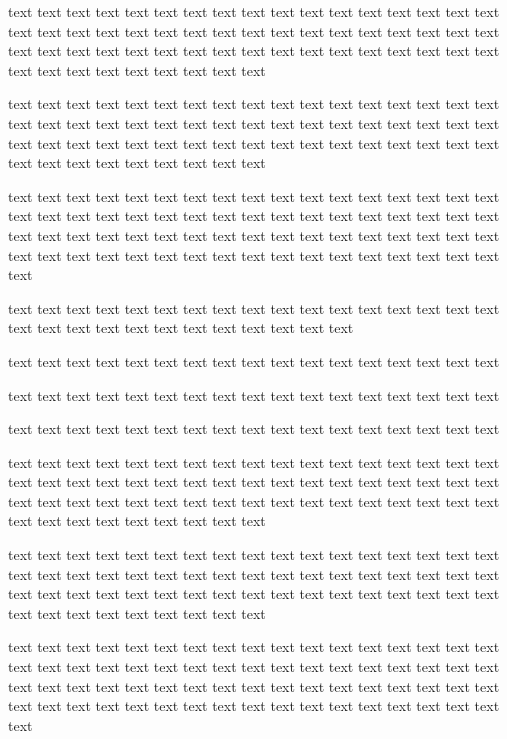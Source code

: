 \documentclass[twocolumn]{article}
\begin{document}
text text text text text text text text text text text text text text text text text text text text text text text text text text text text text text text text text text text text text text text text text text text text text text text text text text text text text text text text text text text text

    text text text text text text text text text text text text text text text text text text text text text text text text text text text text text text text text text text text text text text text text text text text text text text text text text text text text text text text text text text text text

    text text text text text text text text text text text text text text text text text text text text text text text text text text text text text text text text text text text text text text text text text text text text text text text text text text text text text text text text text text text text text text text text text text text text text

    text text text text text text text text text text text text text text text text text text text text text text text text text text text text text

    text text text text text text text text text text text text text text text text text

    text text text text text text text text text text text text text text text text text

    text text text text text text text text text text text text text text text text text

text text text text text text text text text text text text text text text text text text text text text text text text text text text text text text text text text text text text text text text text text text text text text text text text text text text text text text text text text text text text

    text text text text text text text text text text text text text text text text text text text text text text text text text text text text text text text text text text text text text text text text text text text text text text text text text text text text text text text text text text text text

    text text text text text text text text text text text text text text text text text text text text text text text text text text text text text text text text text text text text text text text text text text text text text text text text text text text text text text text text text text text text text text text text text text text text text
\end{document}
